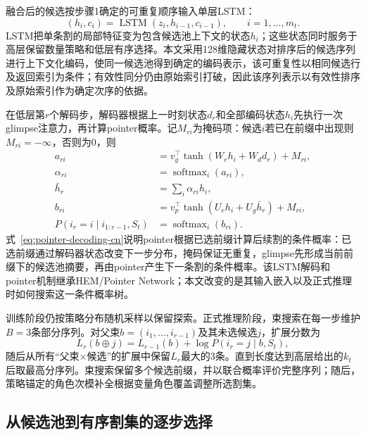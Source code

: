 \documentclass[final,5p,times,twocolumn]{elsarticle}
\begin{document}
融合后的候选按步骤1确定的可重复顺序输入单层LSTM：
\begin{equation}
(h_i,c_i)=\operatorname{LSTM}(z_i,h_{i-1},c_{i-1}),\qquad i=1,\ldots,m_t .
\label{eq:lstm-encoding-cn}
\end{equation}
LSTM把单条割的局部特征变为包含候选池上下文的状态$h_i$；这些状态同时服务于高层保留数量策略和低层有序选择。本文采用128维隐藏状态对排序后的候选序列进行上下文化编码，使同一候选池得到确定的编码表示，该可重复性以相同候选行及返回索引为条件；有效性同分仍由原始索引打破，因此该序列表示以有效性排序及原始索引作为确定次序的依据。

在低层第$r$个解码步，解码器根据上一时刻状态$d_r$和全部编码状态$h_i$先执行一次glimpse注意力，再计算pointer概率。记$M_{ri}$为掩码项：候选$i$若已在前缀中出现则$M_{ri}=-\infty$，否则为0，则
\begin{equation}
\begin{aligned}
a_{ri}&=v_g^\top\tanh(W_e h_i+W_d d_r)+M_{ri},\\
\alpha_{ri}&=\operatorname{softmax}_i(a_{ri}),\\
\bar h_r&=\sum_i\alpha_{ri}h_i,\\
b_{ri}&=v_p^\top\tanh(U_e h_i+U_g\bar h_r)+M_{ri},\\
P(i_r=i\mid i_{1:r-1},S_t)&=\operatorname{softmax}_i(b_{ri}).
\end{aligned}
\label{eq:pointer-decoding-cn}
\end{equation}
式~\eqref{eq:pointer-decoding-cn}说明pointer根据已选前缀计算后续割的条件概率：已选前缀通过解码器状态改变下一步分布，掩码保证无重复，glimpse先形成当前前缀下的候选池摘要，再由pointer产生下一条割的条件概率。该LSTM解码和pointer机制继承HEM/Pointer Network；本文改变的是其输入嵌入以及正式推理时如何搜索这一条件概率树。

训练阶段仍按策略分布随机采样以保留探索。正式推理阶段，束搜索在每一步维护$B=3$条部分序列。对父束$b=(i_1,\ldots,i_{r-1})$及其未选候选$j$，扩展分数为
\begin{equation}
L_r(b\oplus j)=L_{r-1}(b)+\log P(i_r=j\mid b,S_t),
\label{eq:beam-score-cn}
\end{equation}
随后从所有“父束$\times$候选”的扩展中保留$L_r$最大的3条。直到长度达到高层给出的$k_t$后取最高分序列。束搜索保留多个候选前缀，并以联合概率评价完整序列；随后，策略锚定的角色次模补全根据变量角色覆盖调整所选割集。

\subsection{从候选池到有序割集的逐步选择}
\end{document}
